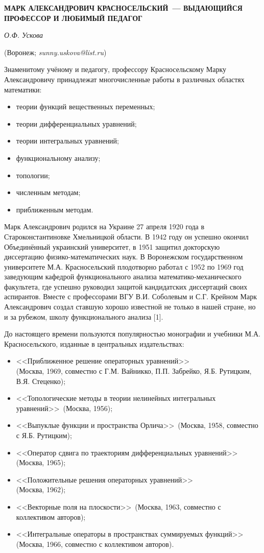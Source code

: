 \begin{center}
    {\bf МАРК АЛЕКСАНДРОВИЧ КРАСНОСЕЛЬСКИЙ~--- ВЫДАЮЩИЙСЯ ПРОФЕССОР И ЛЮБИМЫЙ ПЕДАГОГ}

    {\it О.Ф. Ускова}

    (Воронеж; {\it sunny.uskova@list.ru})
\end{center}


Знаменитому учёному и педагогу, профессору Красносельскому Марку Александровичу принадлежат многочисленные работы в различных
областях математики:
\begin{itemize}
\item теории функций вещественных переменных;
\item теории дифференциальных уравнений;
\item теории интегральных уравнений;
\item функциональному анализу;
\item топологии;
\item численным методам;
\item приближенным методам.
\end{itemize}

Марк Александрович родился на Украине 27 апреля 1920 года в Староконстантиновке Хмельницкой области. В 1942 году он успешно окончил
Объединённый украинский университет, в 1951 защитил докторскую диссертацию физико-математических наук. В Воронежском государственном
университете М.А. Красносельский плодотворно работал с 1952 по 1969 год заведующим кафедрой функционального анализа
математико-механического факультета, где успешно руководил защитой кандидатских диссертаций своих аспирантов. Вместе с профессорами
ВГУ В.И. Соболевым и С.Г. Крейном Марк Александрович создал ставшую хорошо известной не только в нашей стране, но и за рубежом,
школу функционального анализа [1].

До настоящего времени пользуются популярностью монографии и учебники М.А. Красносельского, изданные в центральных издательствах:
\begin{itemize}
\item <<Приближенное решение операторных уравнений>>\\ (Москва, 1969, совместно с Г.М. Вайникко, П.П. Забрейко, Я.Б. Рутицким,
В.Я. Стеценко);
\item <<Топологические методы в теории нелинейных интегральных уравнений>>\, (Москва, 1956);
\item <<Выпуклые функции и пространства Орлича>>\, (Москва, 1958, совместно с Я.Б. Рутицким);
\item <<Оператор сдвига по траекториям дифференциальных уравнений>>\, (Москва, 1965);
\item <<Положительные решения операторных уравнений>>\\(Москва, 1962);
\item <<Векторные поля на плоскости>>\, (Москва, 1963, совместно с коллективом авторов);
\item <<Интегральные операторы в пространствах суммируемых функций>>\, (Москва, 1966, совместно с коллективом авторов).
\end{itemize}

